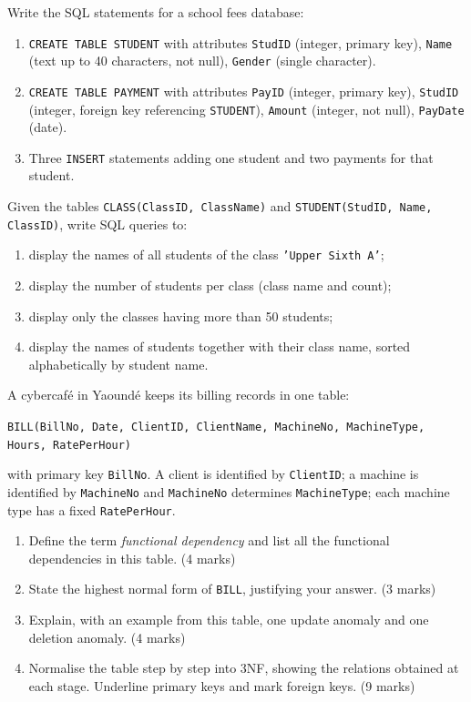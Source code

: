 \documentclass[11pt]{article}
\newcounter{popsec}
\newcounter{popsub}
\newcommand{\courssub}[1]{%
  \stepcounter{popsub}%
  \par\vspace{9pt}\noindent{\popxbold\fontsize{11.5}{13}\selectfont\color{popink}{\color{poporange}\thepopsec.\thepopsub}\hspace{6pt}#1}\par\nopagebreak\vspace{4pt}
}
\begin{document}
\begin{exercice}
Write the SQL statements for a school fees database:
\begin{enumerate}
\item \texttt{CREATE TABLE STUDENT} with attributes \texttt{StudID} (integer, primary key), \texttt{Name} (text up to 40 characters, not null), \texttt{Gender} (single character).
\item \texttt{CREATE TABLE PAYMENT} with attributes \texttt{PayID} (integer, primary key), \texttt{StudID} (integer, foreign key referencing \texttt{STUDENT}), \texttt{Amount} (integer, not null), \texttt{PayDate} (date).
\item Three \texttt{INSERT} statements adding one student and two payments for that student.
\end{enumerate}
\end{exercice}

\begin{exercice}
Given the tables \texttt{CLASS(ClassID, ClassName)} and \texttt{STUDENT(StudID, Name, ClassID)}, write SQL queries to:
\begin{enumerate}
\item display the names of all students of the class \texttt{'Upper Sixth A'};
\item display the number of students per class (class name and count);
\item display only the classes having more than 50 students;
\item display the names of students together with their class name, sorted alphabetically by student name.
\end{enumerate}
\end{exercice}

\courssub{I prepare for the GCE}

\begin{exercice}
A cybercaf\'e in Yaound\'e keeps its billing records in one table:

\texttt{BILL(BillNo, Date, ClientID, ClientName, MachineNo, MachineType, Hours, RatePerHour)}

with primary key \texttt{BillNo}. A client is identified by \texttt{ClientID}; a machine is identified by \texttt{MachineNo} and \texttt{MachineNo} determines \texttt{MachineType}; each machine type has a fixed \texttt{RatePerHour}.
\begin{enumerate}
\item Define the term \emph{functional dependency} and list all the functional dependencies in this table. \hfill (4 marks)
\item State the highest normal form of \texttt{BILL}, justifying your answer. \hfill (3 marks)
\item Explain, with an example from this table, one update anomaly and one deletion anomaly. \hfill (4 marks)
\item Normalise the table step by step into 3NF, showing the relations obtained at each stage. Underline primary keys and mark foreign keys. \hfill (9 marks)
\end{enumerate}
\end{exercice}
\end{document}
